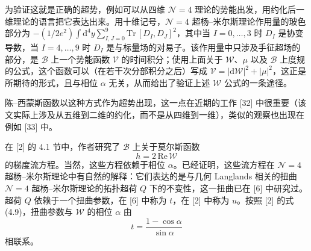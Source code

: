 \documentclass[11pt,a4paper,UTF8]{ctexart}
\theoremstyle{plain}
\theoremstyle{definition}
\begin{document}

为验证这就是正确的超势，例如可以从四维 $\mathcal{N}=4$ 理论的势能出发，用约化后一维理论的语言把它表达出来。用十维记号，$\mathcal{N}=4$ 超杨–米尔斯理论作用量的玻色部分为 $-(1/2e^2)\int \mathrm{d}^4y\sum_{I,J=0}^{9}\mathrm{Tr}\,[D_I,D_J]^2$，其中当 $I=0,\dots,3$ 时 $D_I$ 是协变导数，当 $I=4,\dots,9$ 时 $D_I$ 是与标量场的对易子。该作用量中只涉及手征超场的部分，是 $\mathcal{B}$ 上一个势能函数 $\mathcal{V}$ 的时间积分；使用上面关于 $\mathcal{W}$、$\mu$ 以及 $\mathcal{B}$ 上度规的公式，这个函数可以（在若干次分部积分之后）写成 $\mathcal{V}=|\mathrm{d}\mathcal{W}|^2+|\mu|^2$，这正是所期待的形式，且与相位 $\alpha$ 无关，从而给出了验证上述 $\mathcal{W}$ 公式的一条途径。

陈–西蒙斯函数以这种方式作为超势出现，这一点在近期的工作 [32] 中很重要（该文实际上涉及从五维到二维的约化，而不是从四维到一维），类似的观察也出现在例如 [33] 中。

在 [2] 的 4.1 节中，作者研究了 $\mathcal{B}$ 上关于莫尔斯函数
\begin{equation}
    h=2\,\mathrm{Re}\,\mathcal{W}
    \tag{5.38}
\end{equation}
的梯度流方程。当然，这些方程依赖于相位 $\alpha$。已经证明，这些流方程在 $\mathcal{N}=4$ 超杨–米尔斯理论中有自然的解释：它们表达的是与几何 Langlands 相关的扭曲 $\mathcal{N}=4$ 超杨–米尔斯理论的拓扑超荷 $Q$ 下的不变性，这一扭曲已在 [6] 中研究过。超荷 $Q$ 依赖于一个扭曲参数，在 [6] 中称为 $t$，在 [2] 中称为 $u$。按照 [2] 的式 (4.9)，扭曲参数与 $\mathcal{W}$ 的相位 $\alpha$ 由
\begin{equation}
    t=\frac{1-\cos\alpha}{\sin\alpha}
    \tag{5.39}
\end{equation}
相联系。

\end{document}
